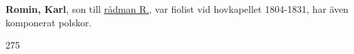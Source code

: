 \textbf{Romin, Karl}, son till \href{Romin-J}{rådman R.}, var fiolist vid hovkapellet 1804-1831, har även komponerat polskor. 

275 
